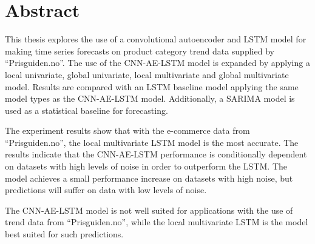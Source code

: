 \section*{Abstract}
\label{section:Abstract}





This thesis explores the use of a convolutional autoencoder and LSTM model for making time series
forecasts on product category trend data supplied by ``Prisguiden.no''.
The use of the CNN-AE-LSTM model is expanded by applying a local univariate, global univariate, local multivariate and global multivariate model.
Results are compared with an LSTM baseline model applying the same model types as the CNN-AE-LSTM model.
Additionally, a SARIMA model is used as a statistical baseline for forecasting.


The experiment results show that with the e-commerce data from ``Prisguiden.no'',
the local multivariate LSTM model is the most accurate.
The results indicate that the CNN-AE-LSTM performance is conditionally dependent on datasets with high levels of noise in order to outperform the LSTM.
The model achieves a small performance increase on datasets with high noise, but predictions will suffer
on data with low levels of noise.

The CNN-AE-LSTM model is not well suited for applications with the use of trend data from ``Prisguiden.no'',
while the local multivariate LSTM is the model best suited for such predictions.







